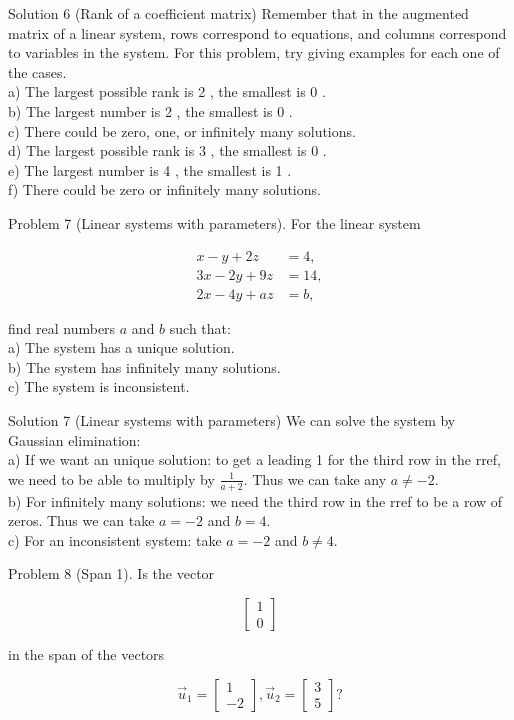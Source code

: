 \documentclass[10pt]{article}
\begin{document}
Solution 6 (Rank of a coefficient matrix) Remember that in the augmented matrix of a linear system, rows correspond to equations, and columns correspond to variables in the system. For this problem, try giving examples for each one of the cases.\\
a) The largest possible rank is 2 , the smallest is 0 .\\
b) The largest number is 2 , the smallest is 0 .\\
c) There could be zero, one, or infinitely many solutions.\\
d) The largest possible rank is 3 , the smallest is 0 .\\
e) The largest number is 4 , the smallest is 1 .\\
f) There could be zero or infinitely many solutions.

Problem 7 (Linear systems with parameters). For the linear system

$$
\begin{aligned}
x-y+2 z & =4, \\
3 x-2 y+9 z & =14, \\
2 x-4 y+a z & =b,
\end{aligned}
$$

find real numbers $a$ and $b$ such that:\\
a) The system has a unique solution.\\
b) The system has infinitely many solutions.\\
c) The system is inconsistent.

Solution 7 (Linear systems with parameters) We can solve the system by Gaussian elimination:\\
a) If we want an unique solution: to get a leading 1 for the third row in the rref, we need to be able to multiply by $\frac{1}{a+2}$. Thus we can take any $a \neq-2$.\\
b) For infinitely many solutions: we need the third row in the rref to be a row of zeros. Thus we can take $a=-2$ and $b=4$.\\
c) For an inconsistent system: take $a=-2$ and $b \neq 4$.

Problem 8 (Span 1). Is the vector

$$
\left[\begin{array}{l}
1 \\
0
\end{array}\right]
$$

in the span of the vectors

$$
\vec{u}_{1}=\left[\begin{array}{c}
1 \\
-2
\end{array}\right], \vec{u}_{2}=\left[\begin{array}{l}
3 \\
5
\end{array}\right] ?
$$
\end{document}
